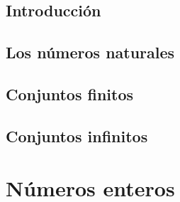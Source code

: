 \documentclass[10pt]{book}
\begin{document}
  \section{Introducción}
  


  \section{Los números naturales}
  


  \section{Conjuntos finitos}
  


  \section{Conjuntos infinitos}
  





\chapter{Números enteros}%
\label{ch:enteros}









\end{document}
